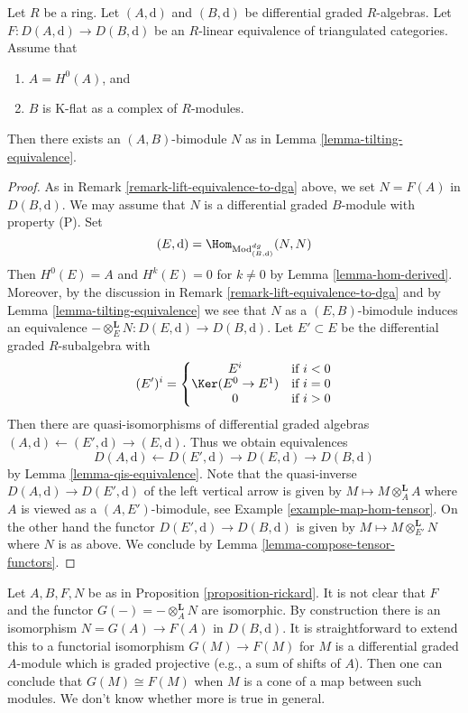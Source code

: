 \begin{proposition}
\label{proposition-rickard}
Let $R$ be a ring. Let $(A, \text{d})$ and $(B, \text{d})$ be
differential graded $R$-algebras. Let $F : D(A, \text{d}) \to D(B, \text{d})$
be an $R$-linear equivalence of triangulated categories. Assume that
\begin{enumerate}
\item $A = H^0(A)$, and
\item $B$ is K-flat as a complex of $R$-modules.
\end{enumerate}
Then there exists an $(A, B)$-bimodule $N$ as in
Lemma \ref{lemma-tilting-equivalence}.
\end{proposition}

\begin{proof}
As in Remark \ref{remark-lift-equivalence-to-dga} above, we set $N = F(A)$
in $D(B, \text{d})$. We may assume that $N$ is a differential graded
$B$-module with property (P). Set
$$
(E, \text{d}) = \Hom_{\text{Mod}^{dg}_{(B, \text{d})}}(N, N)
$$
Then $H^0(E) = A$ and $H^k(E) = 0$ for $k \not = 0$ by
Lemma \ref{lemma-hom-derived}.
Moreover, by the discussion in Remark \ref{remark-lift-equivalence-to-dga}
and by Lemma \ref{lemma-tilting-equivalence}
we see that $N$ as a $(E, B)$-bimodule induces an
equivalence $- \otimes_E^\mathbf{L} N : D(E, \text{d}) \to D(B, \text{d})$.
Let $E' \subset E$ be the differential graded $R$-subalgebra
with
$$
(E')^i = \left\{
\begin{matrix}
E^i & \text{if }i < 0 \\
\Ker(E^0 \to E^1) & \text{if }i = 0 \\
0 & \text{if }i > 0
\end{matrix}
\right.
$$
Then there are quasi-isomorphisms of differential graded
algebras $(A, \text{d}) \leftarrow (E', \text{d}) \rightarrow (E, \text{d})$.
Thus we obtain equivalences
$$
D(A, \text{d}) \leftarrow D(E', \text{d}) \rightarrow D(E, \text{d})
\rightarrow D(B, \text{d})
$$
by Lemma \ref{lemma-qis-equivalence}.
Note that the quasi-inverse $D(A, \text{d}) \to D(E', \text{d})$
of the left vertical arrow is given
by $M \mapsto M \otimes_A^\mathbf{L} A$ where $A$ is viewed as a
$(A, E')$-bimodule, see Example \ref{example-map-hom-tensor}.
On the other hand the functor $D(E', \text{d}) \to D(B, \text{d})$ is given by
$M \mapsto M \otimes_{E'}^\mathbf{L} N$ where $N$ is as above.
We conclude by Lemma \ref{lemma-compose-tensor-functors}.
\end{proof}

\begin{remark}
\label{remark-rickard}
Let $A, B, F, N$ be as in Proposition \ref{proposition-rickard}.
It is not clear that $F$ and the functor
$G(-) = - \otimes_A^\mathbf{L} N$ are isomorphic.
By construction there is an isomorphism
$N = G(A) \to F(A)$ in $D(B, \text{d})$.
It is straightforward to extend this to a functorial isomorphism
$G(M) \to F(M)$ for $M$ is a differential graded $A$-module which
is graded projective (e.g., a sum of shifts of $A$).
Then one can conclude that $G(M) \cong F(M)$ when $M$ is a cone
of a map between such modules. We don't know whether more is true
in general.
\end{remark}


